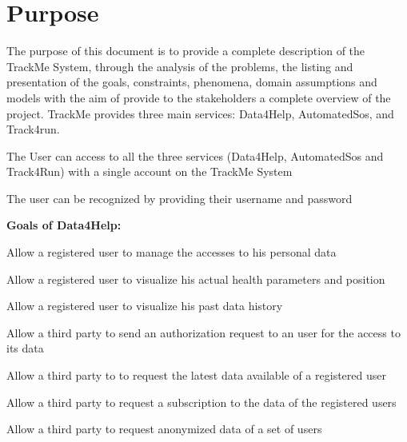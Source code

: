 \section{Purpose}
The purpose of this document is to provide a complete description of the TrackMe System, through the analysis of the problems, the listing and presentation of the goals, constraints, phenomena, domain assumptions and models with the aim of provide to the stakeholders a complete overview of the project. TrackMe provides three main services: Data4Help, AutomatedSos, and Track4run.

\begin{goalList}
\begin{enumerate}[label={[}G\arabic*{]}]

    \item \label{goal:trackme1} The User can access to all the three services (Data4Help, AutomatedSos and Track4Run) with a single account on the TrackMe System
    \item \label{goal:trackme2}The user can be recognized by providing their username and password
    
\end{enumerate}

\textbf{Goals of Data4Help:}
\begin{enumerate}[label={[}G3.\arabic*{]}]

    \item \label{goal:user1}Allow a registered user to manage the accesses to his personal data
    \item \label{goal:user2}Allow a registered user to visualize his actual health     parameters and position
    \item \label{goal:user3}Allow a registered user to visualize his past data history

    \item \label{goal:parties1}Allow a third party to send an authorization request to an     user for the access to its data
    \item \label{goal:parties2}Allow a third party to to request the latest data available     of a registered user

    \item \label{goal:parties3}Allow a third party to request a subscription to the data of the registered users

    \item \label{goal:parties4}Allow a third party to request anonymized data of a set of users


\end{enumerate}
\end{goalList}
